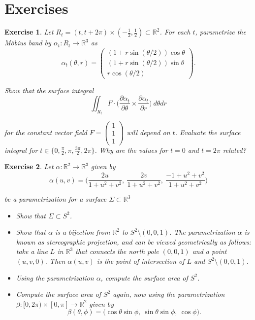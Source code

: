 \documentclass{article}
\newtheorem{q}{Exercise}
\begin{document}
\section{Exercises}


\begin{q}
Let $R_t=(t,t+2\pi)\times(-\frac{1}{2},\frac{1}{2})\subset\mathbb{R}^2$. For each $t$, parametrize the M\"obius band by $\alpha_t:R_t\rightarrow\mathbb{R}^3$ as
\begin{equation*}
\alpha_t(\theta,r)=\begin{pmatrix}(1+r\sin(\theta/2))\cos\theta \\ (1+r\sin(\theta/2))\sin\theta \\ r\cos(\theta/2)\end{pmatrix}.
\end{equation*}

\noindent Show that the surface integral
\begin{equation*}
\iint_{R_t}F\cdot\bigg(\frac{\partial\alpha_t}{\partial\theta}\times\frac{\partial\alpha_t}{\partial r}\bigg)\:d\theta dr
\end{equation*}

\noindent for the constant vector field $F=\begin{pmatrix}1 \\ 1 \\ 1\end{pmatrix}$ will depend on $t$. Evaluate the surface integral for $t\in\{0,\frac{\pi}{2},\pi,\frac{3\pi}{2},2\pi\}$. Why are the values for $t=0$ and $t=2\pi$ related?
\end{q}

\begin{q}
Let $\alpha:\mathbb{R}^2\rightarrow\mathbb{R}^3$ given by
\begin{equation*}
\alpha(u,v)=\bigg(\frac{2u}{1+u^2+v^2},\:\frac{2v}{1+u^2+v^2},\:\frac{-1+u^2+v^2}{1+u^2+v^2}\bigg)
\end{equation*}

\noindent be a parametrization for a surface $\Sigma\subset\mathbb{R}^3$

\begin{itemize}
\item[(a)] Show that $\Sigma\subset S^2$.
\item[(b)] Show that $\alpha$ is a bijection from $\mathbb{R}^2$ to $S^2\setminus(0,0,1)$. The parametrization $\alpha$ is known as stereographic projection, and can be viewed geometrically as follows: take a line $L$ in $\mathbb{R}^3$ that connects the north pole $(0,0,1)$ and a point $(u,v,0)$. Then $\alpha(u,v)$ is the point of intersection of $L$ and $S^2\setminus(0,0,1)$.
\item[(c)] Using the parametrization $\alpha$, compute the surface area of $S^2$.
\item[(d)] Compute the surface area of $S^2$ again, now using the parametrization $\beta:[0,2\pi)\times[0,\pi]\rightarrow\mathbb{R}^2$ given by
\begin{equation*}
\beta(\theta,\phi)=\big(\cos\theta\sin\phi,\:\sin\theta\sin\phi,\:\cos\phi\big).
\end{equation*}
\end{itemize}
\end{q}
\end{document}

